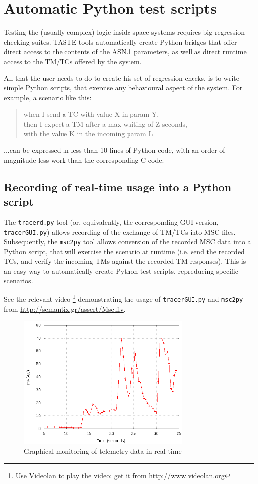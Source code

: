 \documentclass[11pt]{book}
\begin{document}
   \section{Automatic Python test scripts}
Testing the (usually complex) logic inside space systems requires big regression checking suites. TASTE tools automatically create Python bridges that offer direct access to the contents of the ASN.1 parameters, as well as direct runtime access to the TM/TCs offered by the system.

All that the user needs to do to create his set of regression checks, is to write simple Python scripts, that exercise any behavioural aspect of the system. For example, a scenario like this: 


\begin{quote}
when I send a TC with value X in param Y, \\
then I expect a TM after a max waiting of Z seconds, \\
with the value K in the incoming param L
\end{quote} 

...can be expressed in less than 10 lines of Python code, with an order of magnitude less work than the corresponding C code.

\subsection{Recording of real-time usage into a Python script}
The {\tt tracerd.py} tool (or, equivalently, the corresponding GUI version, {\tt tracerGUI.py}) allows recording of the exchange of TM/TCs into MSC files. Subsequently, the {\tt msc2py} tool allows conversion of the recorded MSC data into a Python script, that will exercise the scenario at runtime (i.e. send the recorded TCs, and verify the incoming TMs against the recorded TM responses). This is an easy way to automatically create Python test scripts, reproducing specific scenarios. 

See the relevant video \footnote{Use Videolan to play the video: get it from \url{http://www.videolan.org}} demonstrating the usage of {\tt tracerGUI.py} and {\tt msc2py} from \url{http://semantix.gr/assert/Msc.flv}.

\begin{figure}[!h]
\centering
\includegraphics[width=0.75\textwidth]{imgs/gui2}
\caption{Graphical monitoring of telemetry data in real-time}
\label{gui2}
\end{figure}
\end{document}
